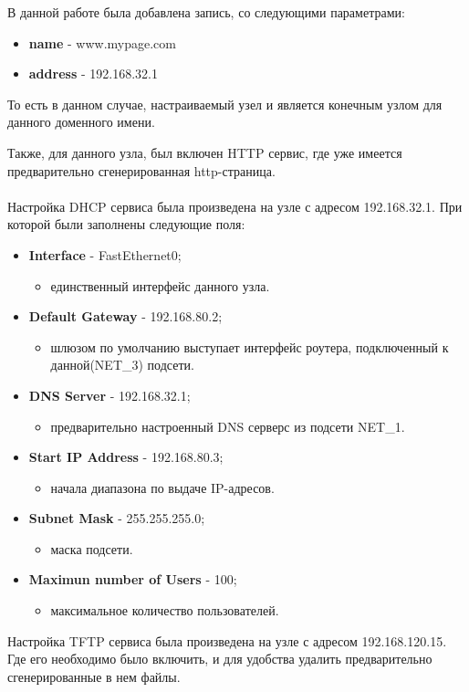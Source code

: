 \documentclass[a4paper, 12pt]{article}		%
\begin{document}
В данной работе была добавлена запись, со следующими параметрами:
\begin{itemize}
\item \textbf{name} - www.mypage.com
\item \textbf{address} - 192.168.32.1
\end{itemize}
То есть в данном случае, настраиваемый узел и является конечным узлом для данного доменного имени.

Также, для данного узла, был включен HTTP сервис, где уже имеется предварительно сгенерированная http-страница.\\\\
Настройка DHCP сервиса была произведена на узле с адресом 192.168.32.1. При которой были заполнены следующие поля:
\begin{itemize}
\item \textbf{Interface} - FastEthernet0;
\begin{itemize}
\item единственный интерфейс данного узла.
\end{itemize}
\item \textbf{Default Gateway} - 192.168.80.2;
\begin{itemize}
\item шлюзом по умолчанию выступает интерфейс роутера, подключенный к данной(NET\_3) подсети.
\end{itemize}
\item \textbf{DNS Server} - 192.168.32.1;
\begin{itemize}
\item предварительно настроенный DNS серверс из подсети NET\_1.
\end{itemize}
\item \textbf{Start IP Address} - 192.168.80.3;
\begin{itemize}
\item начала диапазона по выдаче IP-адресов.
\end{itemize}
\item \textbf{Subnet Mask} - 255.255.255.0;
\begin{itemize}
\item маска подсети.
\end{itemize}
\item \textbf{Maximun number of Users} - 100;
\begin{itemize}
\item максимальное количество пользователей.
\end{itemize}
\end{itemize}
Настройка TFTP сервиса была произведена на узле с адресом 192.168.120.15. Где его необходимо было включить, и для удобства удалить предварительно сгенерированные в нем файлы.
\end{document}
